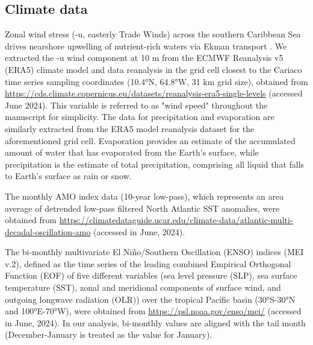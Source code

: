 \documentclass[draft]{agujournal2019}
\begin{document}
\subsection{Climate data}
    Zonal wind stress (-u, easterly Trade Winds) across the southern Caribbean Sea drives nearshore upwelling of nutrient-rich waters via Ekman transport \cite{rueda-roa_southern_2013}. We extracted the -u wind component at 10 m from the ECMWF Reanalysis v5 (ERA5) climate model and data reanalysis in the grid cell closest to the Cariaco time series sampling coordinates (\ang{10.4}N, \ang{64.8}W, 31 km grid size), obtained from \url{https://cds.climate.copernicus.eu/datasets/reanalysis-era5-single-levels} (accessed June 2024). This variable is referred to as "wind speed" throughout the manuscript for simplicity. The data for precipitation and evaporation are similarly extracted from the ERA5 model reanalysis dataset for the aforementioned grid cell. Evaporation provides an estimate of the accumulated amount of water that has evaporated from the Earth's surface, while precipitation is the estimate of total precipitation, comprising all liquid that falls to Earth's surface as rain or snow. 
    
    The monthly AMO index data (10-year low-pass), which represents an area average of detrended low-pass filtered North Atlantic SST anomalies, were obtained from \url{https://climatedataguide.ucar.edu/climate-data/atlantic-multi-decadal-oscillation-amo} (accessed in June, 2024). 
    
    The bi-monthly multivariate El Niño/Southern Oscillation (ENSO) indices (MEI v.2), defined as the time series of the leading combined Empirical Orthogonal Function (EOF) of five different variables (sea level pressure (SLP), sea surface temperature (SST), zonal and meridional components of surface wind, and outgoing longwave radiation (OLR)) over the tropical Pacific basin (\ang{30}S-\ang{30}N and \ang{100}E-\ang{70}W), were obtained from \url{https://psl.noaa.gov/enso/mei/} (accessed in June, 2024). In our analysis, bi-monthly values are aligned with the tail month (December-January is treated as the value for January).
    
\end{document}
